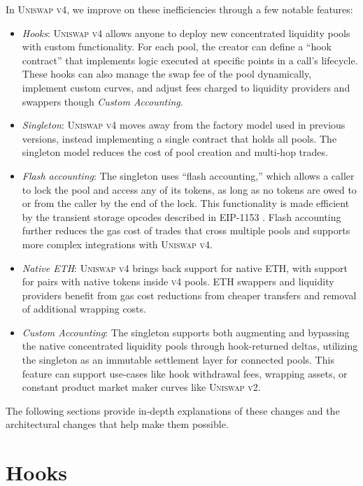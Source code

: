 \documentclass[sigconf,nonacm,prologue,table]{acmart}
\numberwithin{equation}{section}
\theoremstyle{definition}
\theoremstyle{remark}
\begin{document}
In \textsc{Uniswap v4}, we improve on these inefficiencies through a few notable features:
\begin{itemize}
    \item \emph{Hooks}: \textsc{Uniswap v4} allows anyone to deploy new concentrated liquidity pools with custom functionality. For each pool, the creator can define a “hook contract” that implements logic executed at specific points in a call’s lifecycle. These hooks can also manage the swap fee of the pool dynamically, implement custom curves, and adjust fees charged to liquidity providers and swappers though \emph{Custom Accounting}.
    \item \emph{Singleton}: \textsc{Uniswap v4} moves away from the factory model used in previous versions, instead implementing a single contract that holds all pools. The singleton model reduces the cost of pool creation and multi-hop trades.
    \item \emph{Flash accounting}:  The singleton uses “flash accounting,” which allows a caller to lock the pool and access any of its tokens, as long as no tokens are owed to or from the caller by the end of the lock. This functionality is made efficient by the transient storage opcodes described in EIP-1153 \cite{Akhunov2018}. Flash accounting further reduces the gas cost of trades that cross multiple pools and supports more complex integrations with \textsc{Uniswap v4}.
    \item \emph{Native ETH}: \textsc{Uniswap v4} brings back support for native ETH, with support for pairs with native tokens inside \textsc{v4} pools. ETH swappers and liquidity providers benefit from gas cost reductions from cheaper transfers and removal of additional wrapping costs.
   \item \emph{Custom Accounting}: The singleton supports both augmenting and bypassing the native concentrated liquidity pools through hook-returned deltas, utilizing the singleton as an immutable settlement layer for connected pools. This feature can support use-cases like hook withdrawal fees, wrapping assets, or constant product market maker curves like \textsc{Uniswap v2}.
\end{itemize}

The following sections provide in-depth explanations of these changes and the architectural changes that help make them possible.

\section{Hooks} 
\label{sec:Hooks}
\end{document}
